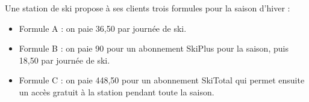 \documentclass[11pt]{article}
\newcommand{\euro}{\eurologo{}}
\begin{document}
Une station de ski propose à ses clients trois formules pour la saison d'hiver :

\begin{itemize}
	\item Formule A : on paie 36,50 \euro{} par journée de ski.
	
	\item Formule B : on paie 90 \euro{} pour un abonnement \og SkiPlus \fg{} pour la saison, puis 18,50 \euro{} par journée de ski.
	
	\item Formule C : on paie 448,50 \euro{} pour un abonnement \og SkiTotal \fg{} qui permet ensuite un accès gratuit à la station pendant toute la saison.
\end{itemize}

\medskip
\end{document}
